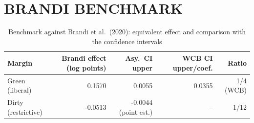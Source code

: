 \documentclass{article}
\begin{document}
\section{BRANDI BENCHMARK}

\begin{table}[htbp]
\centering
\caption{Benchmark against Brandi et al.\ (2020): equivalent effect and comparison with the confidence intervals}
\label{tab:brandi}
\small
\begin{tabular}{lrrrr}
\toprule
Margin & Brandi effect (log points) & Asy.\ CI upper & WCB CI upper/coef. & Ratio \\
\midrule
Green (liberal) & 0.1570 & 0.0055 & 0.0355 & 1/4 (WCB) \\
Dirty (restrictive) & -0.0513 & -0.0044 (point est.) & -- & 1/12 \\
\bottomrule
\end{tabular}
\end{table}
\end{document}
